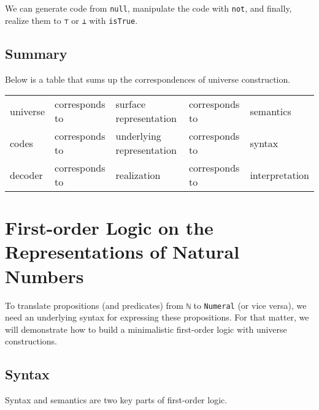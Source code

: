 \documentclass[\main/thesis.tex]{subfiles}
\begin{document}
We can generate code from \lstinline|null|,
manipulate the code with \lstinline|not|,
and finally, realize them to \lstinline|⊤| or \lstinline|⊥| with \lstinline|isTrue|.

\subsection{Summary}

Below is a table that sums up the correspondences of universe construction.

\begin{center}
    \begin{adjustbox}{max width=\textwidth}
    \begin{tabular}{ l l l l l }
    universe & corresponds to & surface representation & corresponds to & semantics \\
    codes & corresponds to & underlying representation & corresponds to & syntax \\
    decoder & corresponds to & realization & corresponds to & interpretation \\
    \end{tabular}
    \end{adjustbox}
\end{center}

\section{First-order Logic on the Representations of Natural Numbers}


To translate propositions (and predicates) from \lstinline|ℕ| to
\lstinline|Numeral| (or vice versa),
we need an underlying syntax for expressing these propositions.
For that matter, we will demonstrate how to build a minimalistic first-order
logic with universe constructions.

\subsection{Syntax}
Syntax and semantics are two key parts of first-order logic.
\end{document}
